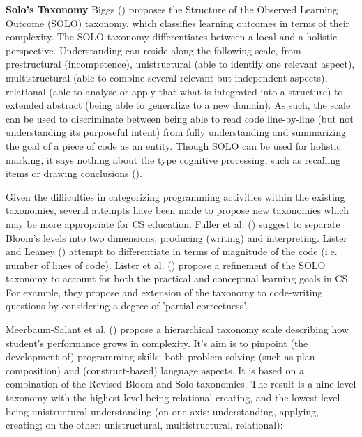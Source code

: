 \textbf{Solo's Taxonomy}\newline
Biggs (\cite{biggs1996}) proposes the Structure of the Observed Learning Outcome (SOLO) taxonomy, which classifies learning outcomes in terms of their complexity. The SOLO taxonomy differentiates between a local and a holistic perspective. Understanding can reside along the following scale, from prestructural (incompetence), unistructural (able to identify one relevant aspect), multistructural (able to combine several relevant but independent aspects), relational (able to analyse or apply that what is integrated into a structure) to extended abstract (being able to generalize to a new domain). As such, the scale can be used to discriminate between being able to read code line-by-line (but not understanding its purposeful intent) from fully understanding and summarizing the goal of a piece of code as an entity. Though SOLO can be used for holistic marking, it says nothing about the type cognitive processing, such as recalling items or drawing conclusions (\cite{Fuller2007}).


Given the difficulties in categorizing programming activities within the existing taxonomies, several attempts have been made to propose new taxonomies which may be more appropriate for CS education. Fuller et al. (\cite{Fuller2007}) suggest to separate Bloom’s levels into two dimensions, producing (writing) and interpreting. Lister and Leaney (\cite{lister2003}) attempt to differentiate in terms of magnitude of the code (i.e. number of lines of code). Lister et al. (\cite{lister2010naturally}) propose a refinement of the SOLO taxonomy to account for both the practical and conceptual learning goals in CS. For example, they propose and extension of the taxonomy to code-writing questions by considering a degree of 'partial correctness'.


Meerbaum-Salant et al. (\cite{Meerbaum2013}) propose a hierarchical taxonomy scale describing how student’s performance grows in complexity. It’s aim is to pinpoint (the development of) programming skills: both problem solving (such as plan composition) and (construct-based) language aspects. It is based on a combination of the Revised Bloom and Solo taxonomies. The result is a nine-level taxonomy with
the highest level being relational creating, and the lowest level being
unistructural understanding (on one axis: understanding, applying, creating; on the other: unistructural, multistructural, relational):



